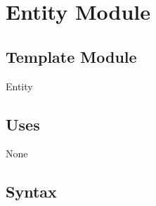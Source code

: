 \documentclass[12pt]{article}
\begin{document}







\section*{Entity Module}

\subsection*{Template Module}

Entity

\subsection*{Uses}

None %

\subsection*{Syntax}
\end{document}
